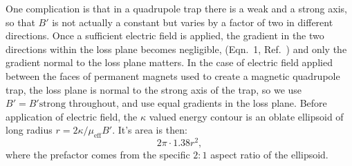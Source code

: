 \documentclass[%
 reprint,
 amsmath,amssymb,
 aps,
pra,
]{revtex4-1}
\begin{document}
One complication is that in a quadrupole trap there is a weak and a strong axis, so that $B'$ is not actually a constant but varies by a factor of two in different directions.
Once a sufficient electric field is applied, the gradient in the two directions within the loss plane becomes negligible, (Eqn.~1, Ref.~\cite{smt}) and only the gradient normal to the loss plane matters.
In the case of electric field applied between the faces of permanent magnets used to create a magnetic quadrupole trap, the loss plane is normal to the strong axis of the trap, so we use $B'=B'{\text{strong}}$ throughout, and use equal gradients in the loss plane.
Before application of electric field, the $\kappa$ valued energy contour is an oblate ellipsoid of long radius $r=2\kappa/\mu_\text{eff}B'$. It's area is then:
\begin{equation}
2\pi\cdot1.38r^2,
\end{equation}
where the prefactor comes from the specific $2:1$ aspect ratio of the ellipsoid.



\end{document}
